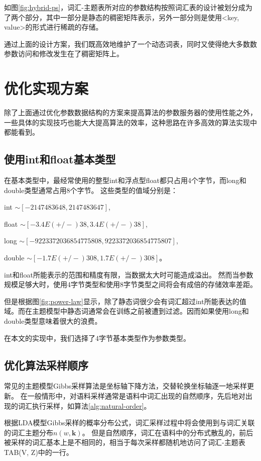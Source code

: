 如图\ref{fig:hybrid-ps}，词汇-主题表所对应的参数结构按照词汇表的设计被划分成为了两个部分，其中一部分是静态的稠密矩阵表示，另外一部分则是使用<key, value>的形式进行稀疏的存储。

通过上面的设计方案，我们既高效地维护了一个动态词表，同时又使得绝大多数数参数访问和修改发生在了稠密矩阵上。

\section{优化实现方案}
除了上面通过优化参数数据结构的方案来提高算法的参数服务器的使用性能之外，
一些具体的实现技巧也能大大提高算法的效率，这种思路在许多高效的算法实现中都能看到。

\subsection{使用int和float基本类型}
在基本类型中，最经常使用的整型int和浮点型float都只占用4个字节，而long和double类型通常占用8个字节。
这些类型的值域分别是：

int $\sim [-2147483648, 2147483647]$,

float $\sim [-3.4E(+/-)38, 3.4E(+/-)38]$, 

long $\sim [-9223372036854775808, 9223372036854775807]$,
	 
double $\sim [-1.7E(+/-)308, 1.7E(+/-)308]$。

int和float所能表示的范围和精度有限，当数据太大时可能造成溢出。
然而当参数规模足够大时，使用4字节类型和使用8字节类型之间将会有成倍的存储效率差距。

但是根据图\ref{fig:power-law}显示，除了静态词很少会有词汇超过int所能表达的值域。而在主题模型中静态词通常会在训练之前被遭到过滤。因而如果使用long和double类型意味着很大的浪费。

在本文的实现中，我们选择了4字节基本类型作为参数类型。

\subsection{优化算法采样顺序}
常见的主题模型Gibbs采样算法是坐标轴下降方法，交替轮换坐标轴逐一地采样更新。
在一般情形中，对语料采样通常是语料中词汇出现的自然顺序，先后地对出现的词汇执行采样，如算法\ref{alg:natural-order}。

根据LDA模型Gibbs采样的概率分布公式，词汇采样过程中将会使用到与词汇关联的词汇主题分布$n(w, \mathbf{k})$。
但是自然顺序，词汇在语料中的分布式散乱的，前后被采样的词汇基本上是不相同的，相当于每次采样都随机地访问了词汇-主题表TAB(V, Z)中的一行。

